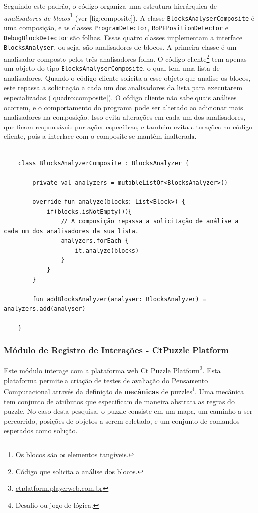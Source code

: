 Seguindo este padrão, o código organiza uma estrutura hierárquica de \textit{analisadores de blocos}\footnote{Os blocos são os elementos tangíveis.} (ver \autoref{fig:composite}). A classe \texttt{BlocksAnalyserComposite} é uma composição, e as classes \texttt{ProgramDetector}, \texttt{RoPEPositionDetector} e \texttt{DebugBlockDetector} são folhas. Essas quatro classes implementam a interface \texttt{BlocksAnalyser}, ou seja, são analisadores de blocos. A primeira classe é um analisador composto pelos três analisadores folha.
O código cliente\footnote{Código que solicita a análise dos blocos.} tem apenas um objeto do tipo \texttt{BlocksAnalyserComposite}, o qual tem uma lista de analisadores. Quando o código cliente solicita a esse objeto que analise os blocos, este repassa a solicitação a cada um dos analisadores da lista para executarem especializadas (\autoref{quadro:composite}). O código cliente não sabe quais análises ocorrem, e o comportamento do programa pode ser alterado ao adicionar mais analisadores na composição. Isso evita alterações em cada um dos analisadores, que ficam responsáveis por ações específicas, e também evita alterações no código cliente, pois a interface com o composite se mantém inalterada.

\begin{quadro}[!h]
    \begin{verbatim}
    
    class BlocksAnalyzerComposite : BlocksAnalyzer {

        private val analyzers = mutableListOf<BlocksAnalyzer>()

        override fun analyze(blocks: List<Block>) {
            if(blocks.isNotEmpty()){
                // A composição repassa a solicitação de análise a cada um dos analisadores da sua lista.
                analyzers.forEach {
                    it.analyze(blocks)
                }
            }
        }

        fun addBlocksAnalyzer(analyser: BlocksAnalyzer) = analyzers.add(analyser)
        
    }
    \end{verbatim}
    \label{quadro:composite}
\end{quadro}

\subsubsection{Módulo de Registro de Interações - CtPuzzle Platform}
Este módulo interage com a plataforma web Ct Puzzle Platform\footnote{\url{ctplatform.playerweb.com.br}}. Esta plataforma permite a criação de testes de avaliação do Pensamento Computacional através da definição de \textbf{mecânicas} de puzzles\footnote{Desafio ou jogo de lógica.}. Uma mecânica tem conjunto de atributos que especificam de maneira abstrata as regras do puzzle. No caso desta pesquisa, o puzzle consiste em um mapa, um caminho a ser percorrido, posições de objetos a serem coletado, e um conjunto de comandos esperados como solução. 

